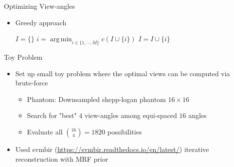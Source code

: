 \documentclass[english,aspectratio=169]{beamer}
\DeclareMathOperator*{\argmin}{arg\,min}
\begin{document}
\begin{frame}{Optimizing View-angles}
	\begin{itemize}
	    \setlength\itemsep{2em}
		\item Greedy approach
		
		\begin{algorithm}[H]
        \begin{algorithmic}[1]
        \STATE $I = \{\}$
            \STATE  $i = \argmin_{i \in \{1,\cdots,M \} } c(I \cup \{ i \})$
            \STATE $I = I \cup \{ i \}$
        \ENDWHILE
        
        \end{algorithmic}
        \label{alg:angle_greedy}
        \end{algorithm}
        
	\end{itemize}
	
\end{frame}


\begin{frame}{Toy Problem}
	\begin{itemize}
	    \setlength\itemsep{2em}
		\item Set up small toy problem where the optimal views can be computed via brute-force
		\begin{itemize}
		    \item Phantom: Downsampled shepp-logan phantom $16\times16$
		    \item Search for "best" $4$ view-angles among equi-spaced $16$ angles
		    \item Evaluate all ${16 \choose 4} = 1820$ possibilities
	    \end{itemize}
		
		
	    \item Used svmbir (\url{https://svmbir.readthedocs.io/en/latest/}) iterative reconstruction with MRF prior
	    
        
	\end{itemize}
	
\end{frame}
\end{document}
